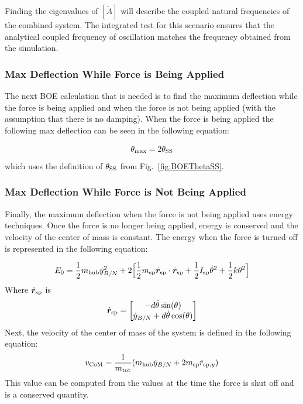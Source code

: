 Finding the eigenvalues of $[\tilde{A}]$ will describe the coupled natural frequencies of the combined system. The integrated test for this scenario ensures that the analytical coupled frequency of oscillation matches the frequency obtained from the simulation. 

\subsubsection{Max Deflection While Force is Being Applied}

The next BOE calculation that is needed is to find the maximum deflection while the force is being applied and when the force is not being applied (with the assumption that there is no damping). When the force is being applied the following max deflection can be seen in the following equation:

\begin{equation}
\theta_{\textnormal{max}} = 2 \theta_{\textnormal{SS}}
\end{equation}
which uses the definition of $\theta_{\textnormal{SS}}$ from Fig.~\ref{fig:BOEThetaSS}. 

\subsubsection{Max Deflection While Force is Not Being Applied}

Finally, the maximum deflection when the force is not being applied uses energy techniques. Once the force is no longer being applied, energy is conserved and the velocity of the center of mass is constant. The energy when the force is turned off is represented in the following equation:

\begin{equation}
E_0 = \frac{1}{2} m_{\textnormal{hub}} \dot{y}_{B/N}^2 + 2\Big[\frac{1}{2} m_{\textnormal{sp}} \dot{\bm r}_{\textnormal{sp}} \cdot \dot{\bm r}_{\textnormal{sp}}  +  \frac{1}{2} I_{\textnormal{sp}} \dot{\theta}^2 + \frac{1}{2} k \theta^2\Big]
\end{equation}
Where $\dot{\bm r}_{\textnormal{sp}}$ is
\begin{equation}
\dot{\bm r}_{\textnormal{sp}} = \begin{bmatrix}
-d \dot{\theta} \sin (\theta)\\
\dot{y}_{B/N}  + d \dot{\theta} \cos (\theta)\\
\end{bmatrix}
\end{equation}
Next, the velocity of the center of mass of the system is defined in the following equation:
\begin{equation}
v_{\textnormal{CoM}} = \frac{1}{m_{\textnormal{tot}}}(m_{\textnormal{hub}} \dot{y}_{B/N} + 2 m_{\textnormal{sp}}\dot{ r}_{\textnormal{sp},y})
\end{equation}
This value can be computed from the values at the time the force is shut off and is a conserved quantity.

